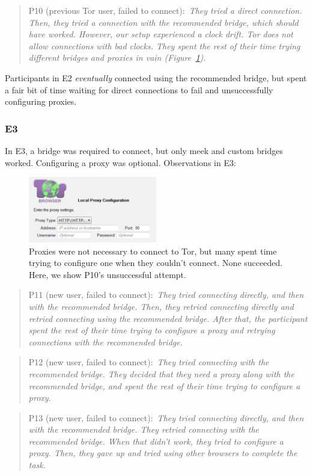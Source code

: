 \documentclass[USenglish,oneside,twocolumn]{article}
\newcommand{\pquote}[2]{
\begin{quotation}
\noindent #1:~\textit{#2}
\end{quotation}
}
\begin{document}
\pquote{P10 (previous Tor user, failed to connect)}{They tried a direct connection. Then, they tried a connection with the recommended bridge, which should have worked. However, our setup experienced a clock drift. Tor does not allow connections with bad clocks. They spent the rest of their time trying different bridges and proxies in vain (Figure~\ref{fig:proxy-attempt}).}

Participants in E2 {\it eventually} connected using the recommended bridge, but spent a fair bit of time waiting for direct connections to fail and unsuccessfully configuring proxies. 

\subsubsection{E3}
In E3, a bridge was required to connect, but only meek and custom bridges worked. Configuring a proxy was optional.
Observations in E3: 

\begin{figure}[t]
\centering
\includegraphics[width=0.5\textwidth]{P8-proxy-attempt.png}
\caption{
Proxies were not necessary to connect to Tor, but many spent time trying to configure one when they couldn't connect. None succeeded. Here, we show P10's unsuccessful attempt. 
}
\label{fig:proxy-attempt}
\end{figure}

\pquote{P11 (new user, failed to connect)}{They tried connecting directly, and then with the recommended bridge. Then, they retried connecting directly and retried connecting using the recommended bridge. After that, the participant spent the rest of their time trying to configure a proxy and retrying connections with the recommended bridge.}

\pquote{P12 (new user, failed to connect)}{They tried connecting with the recommended bridge. They decided that they need a proxy along with the recommended bridge, and spent the rest of their time trying to configure a proxy.}

\pquote{P13 (new user, failed to connect)}{They tried connecting directly, and then with the recommended bridge. They retried connecting with the recommended bridge. When that didn't work, they tried to configure a proxy. Then, they gave up and tried using other browsers to complete the task.}
\end{document}
